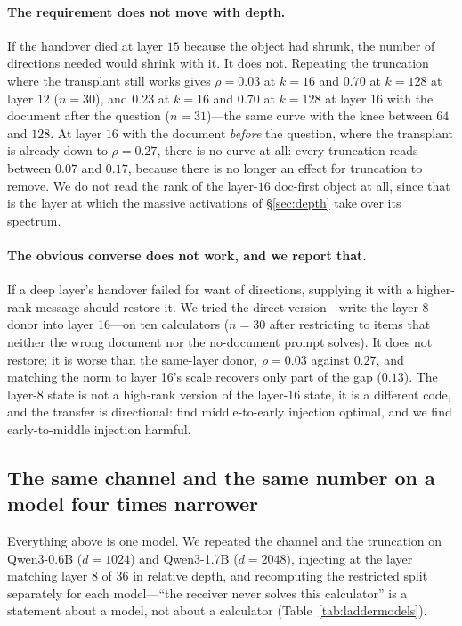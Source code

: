 \documentclass{article}
\begin{document}
\paragraph{The requirement does not move with depth.} If the handover died at
layer $15$ because the object had shrunk, the number of directions needed would
shrink with it. It does not. Repeating the truncation where the transplant still
works gives $\rho = 0.03$ at $k=16$ and $0.70$ at $k=128$ at layer $12$
($n=30$), and $0.23$ at $k=16$ and $0.70$ at $k=128$ at layer $16$ with the
document after the question ($n=31$)---the same curve with the knee between $64$
and $128$. At layer $16$ with the document \emph{before} the question, where the
transplant is already down to $\rho=0.27$, there is no curve at all: every
truncation reads between $0.07$ and $0.17$, because there is no longer an effect
for truncation to remove. We do not read the rank of the layer-$16$
doc-first object at all, since that is the layer at which the massive
activations of \S\ref{sec:depth} take over its spectrum.



\paragraph{The obvious converse does not work, and we report that.} If a deep
layer's handover failed for want of directions, supplying it with a higher-rank
message should restore it. We tried the direct version---write the layer-8
donor into layer 16---on ten calculators ($n=30$ after restricting to items that
neither the wrong document nor the no-document prompt solves). It does not
restore; it is worse than the same-layer donor, $\rho = 0.03$ against $0.27$,
and matching the norm to layer 16's scale recovers only part of the gap
($0.13$). The layer-8 state is not a high-rank version of the layer-16 state, it
is a different code, and the transfer is directional:
\citet{ardoin2026promptcompression} find middle-to-early injection optimal, and
we find early-to-middle injection harmful.

\subsection{The same channel and the same number on a model four times
narrower}


Everything above is one model. We repeated the channel and the truncation on
Qwen3-0.6B ($d=1024$) and Qwen3-1.7B ($d=2048$), injecting at the layer matching
layer $8$ of $36$ in relative depth, and recomputing the restricted split
separately for each model---``the receiver never solves this calculator'' is a
statement about a model, not about a calculator
(Table~\ref{tab:laddermodels}).
\end{document}
